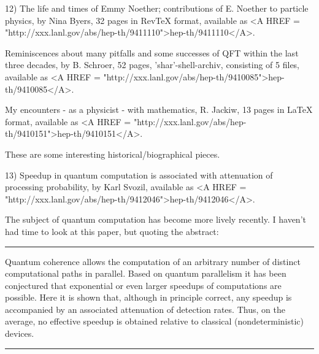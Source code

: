12) The life and times of Emmy Noether; contributions of E. Noether to
particle physics, by Nina Byers, 32 pages in RevTeX format, available as
<A HREF = "http://xxx.lanl.gov/abs/hep-th/9411110">hep-th/9411110</A>.

Reminiscences about many pitfalls and some successes of QFT within the last
three decades, by B. Schroer, 52 pages, 'shar'-shell-archiv, consisting of 5
files, available as <A HREF = "http://xxx.lanl.gov/abs/hep-th/9410085">hep-th/9410085</A>.  

My encounters - as a physicist - with mathematics, R. Jackiw, 13
pages in LaTeX format, available as <A HREF = "http://xxx.lanl.gov/abs/hep-th/9410151">hep-th/9410151</A>. 


These are some interesting historical/biographical pieces.


13) Speedup in quantum computation is associated with attenuation of
processing probability, by Karl Svozil, available as <A HREF = "http://xxx.lanl.gov/abs/hep-th/9412046">hep-th/9412046</A>.

The subject of quantum computation has become more lively recently.
I haven't had time to look at this paper, but quoting the abstract:

\par\noindent\rule{\textwidth}{0.4pt}
Quantum coherence allows the computation of an arbitrary number of
distinct computational paths in parallel. Based on quantum parallelism
it has been conjectured that exponential or even larger speedups of
computations are possible. Here it is shown that, although in principle
correct, any speedup is accompanied by an associated attenuation of
detection rates. Thus, on the average, no effective speedup is obtained
relative to classical (nondeterministic) devices.
\par\noindent\rule{\textwidth}{0.4pt}


